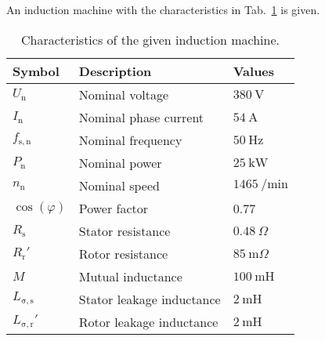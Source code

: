 \FloatBarrier



An induction machine with the characteristics in Tab.~\ref{tab:characteristicsIM_task2} is given.
\begin{table}[htb]
    \caption{Characteristics of the given induction machine.}
    \centering
    \begin{tabular}{lll}\toprule
    Symbol  & Description       & Values \\
    \midrule
    $U_{\mathrm{n}}$    & Nominal voltage           & $\SI{380}{\volt}$ \\
    $I_{\mathrm{n}}$    & Nominal phase current     & $\SI{54}{\ampere}$ \\
    $f_{\mathrm{s,n}}$  & Nominal frequency         & $\SI{50}{\hertz}$ \\
    $P_{\mathrm{n}}$    & Nominal power             & $\SI{25}{\kilo\watt}$ \\
    $n_{\mathrm{n}}$    & Nominal speed             & $\SI{1465}{\per\minute}$ \\
    $\cos(\varphi)$     & Power factor              & 0.77 \\
    \midrule
    $R_{\mathrm{s}}$    & Stator resistance         & $\SI{0.48}{\Omega}$ \\
    $R_{\mathrm{r}}'$    & Rotor resistance          & $\SI{85}{\milli\Omega}$ \\
    $M$                 & Mutual inductance         & $\SI{100}{\milli\henry}$ \\
    $L_{\mathrm{\sigma,s}}$    & Stator leakage inductance  & $\SI{2}{\milli\henry}$ \\
    $L_{\mathrm{\sigma,r}}'$    & Rotor leakage inductance   & $\SI{2}{\milli\henry}$ \\
    \bottomrule
    \end{tabular}
    \label{tab:characteristicsIM_task2}
\end{table}



